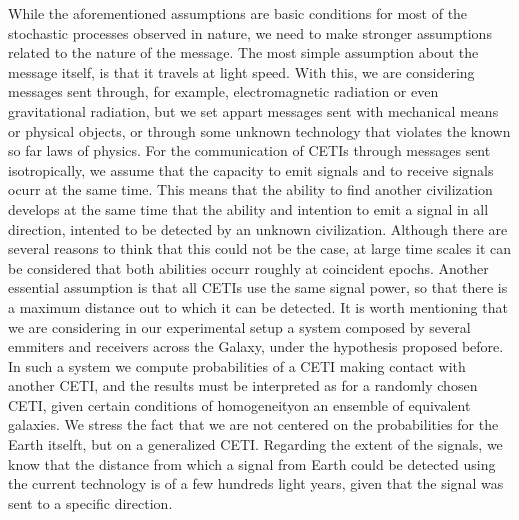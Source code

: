 \documentclass[crop]{CSLB}%
\begin{document}
While the aforementioned assumptions are basic conditions for most of
the stochastic processes observed in nature, we need to make stronger
assumptions related to the nature of the message.
%
The most simple assumption about the message itself, is that it
travels at light speed.
%
With this, we are considering messages sent through, for example,
electromagnetic radiation or even gravitational radiation, but we set
appart messages sent with mechanical means or physical objects, or
through some unknown technology that violates the known so far laws of
physics.
% 
For the communication of CETIs through messages sent isotropically, we
assume that the capacity to emit signals and to receive signals ocurr
at the same time.
%
This means that the ability to find another civilization develops at
the same time that the ability and intention to emit a signal in all
direction, intented to be detected by an unknown civilization.
%
Although there are several reasons to think that this could not be the
case, at large time scales it can be considered that both abilities
occurr roughly at coincident epochs.
%
Another essential assumption is that all CETIs use the same signal
power, so that there is a maximum distance out to which it can be
detected.
%
It is worth mentioning that we are considering in our experimental
setup a system composed by several emmiters and receivers across the
Galaxy, under the hypothesis proposed before.
%
In such a system we compute probabilities of a CETI making contact
with another CETI, and the results must be interpreted as for a
randomly chosen CETI, given certain conditions of homogeneityon an
ensemble of equivalent galaxies.
%
We stress the fact that we are not centered on the probabilities for
the Earth itselft, but on a generalized CETI.
%
Regarding the extent of the signals, we know that the distance from
which a signal from Earth could be detected using the current
technology is of a few hundreds light years, given that the signal was
sent to a specific direction.


   
\end{document}
